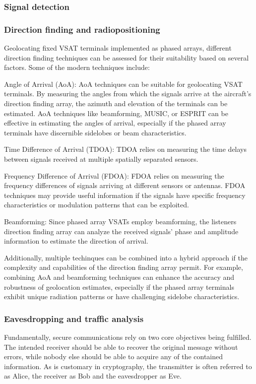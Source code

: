 \documentclass[english, 12pt, a4paper, elec, utf8, a-1b, online]{aaltothesis}
\begin{document}
\subsubsection{Signal detection}
\subsubsection{Direction finding and radiopositioning}
Geolocating fixed VSAT terminals implemented as phased arrays, different direction finding techniques can be assessed for their suitability based on several factors.
Some of the modern techniques include:

Angle of Arrival (AoA): AoA techniques can be suitable for geolocating VSAT terminals.
By measuring the angles from which the signals arrive at the aircraft's direction finding array, the azimuth and elevation of the terminals can be estimated.
AoA techniques like beamforming, MUSIC, or ESPRIT can be effective in estimating the angles of arrival, especially if the phased array terminals have discernible sidelobes or beam characteristics.

Time Difference of Arrival (TDOA): TDOA relies on measuring the time delays between signals received at multiple spatially separated sensors.

Frequency Difference of Arrival (FDOA): FDOA relies on measuring the frequency differences of signals arriving at different sensors or antennas.
FDOA techniques may provide useful information if the signals have specific frequency characteristics or modulation patterns that can be exploited.

Beamforming: Since phased array VSATs employ beamforming, the listeners direction finding array can analyze the received signals' phase and amplitude information to estimate the direction of arrival.

Additionally, multiple techinques can be combined into a hybrid approach if the complexity and capabilities of the direction finding array permit.
For example, combining AoA and beamforming techniques can enhance the accuracy and robustness of geolocation estimates, especially if the phased array terminals exhibit unique radiation patterns or have challenging sidelobe characteristics.

\subsubsection{Eavesdropping and traffic analysis}
Fundamentally, secure communications rely on two core objectives being fulfilled.
The intended receiver should be able to recover the original message without errors, while nobody else should be able to acquire any of the contained information.
As is customary in cryptography, the transmitter is often referred to as Alice, the receiver as Bob and the eavesdropper as Eve.
\cite{bloch2011physical}
\end{document}
